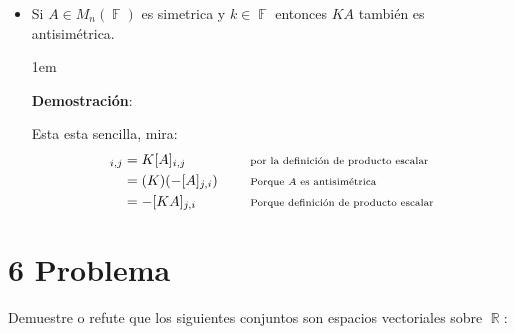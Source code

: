 \documentclass[12pt, fleqn]{article}                             %
\newenvironment{SmallIndentation}[1][0.75em]                    %
        {\begin{adjustwidth}{#1}{}\begin{footnotesize}}             %
        {\end{footnotesize}\end{adjustwidth}}                       %
\DeclareMathOperator \Space {\quad}                             %
\newcommand \Remember[1]{\Space\text{\scriptsize{#1}}}          %
\theoremstyle{break}                                            %
\DeclareMathOperator \Reals        {\mathbb{R}}                 %
\DeclareMathOperator \GenericField {\mathbb{F}}                 %
\begin{document}
\begin{itemize}
\begin{SmallIndentation}[1em]
            Esta esta sencilla, mira:
            \begin{align*}
                [KA]_{i, j}
                    &= K [A]_{i, j}     
                        && \Remember{por la definición de producto escalar} \\
                    &= K [A]_{j, i}
                        && \Remember{Porque $A$ es simetrica}               \\
                    &= [KA]_{j, i}
                        && \Remember{Porque definición de producto escalar}
            \end{align*}

        \end{SmallIndentation}

    \item Si $A \in M_{n}(\GenericField)$ es simetrica y $k \in \GenericField$ entonces 
        $KA$ también es antisimétrica.

        \begin{SmallIndentation}[1em]
            \textbf{Demostración}:

            Esta esta sencilla, mira:
            \begin{align*}
                [KA]_{i, j}
                    &= K [A]_{i, j}     
                        && \Remember{por la definición de producto escalar} \\
                    &= (K)(-[A]_{j, i})
                        && \Remember{Porque $A$ es antisimétrica}           \\
                    &= -[KA]_{j, i}
                        && \Remember{Porque definición de producto escalar}
            \end{align*}

        \end{SmallIndentation}

    \end{itemize}

\clearpage
\section{6 Problema}

    Demuestre o refute que los siguientes conjuntos son espacios vectoriales
    sobre $\Reals$:
\end{document}
